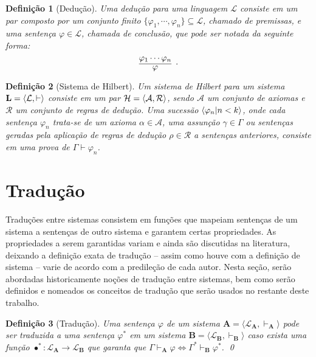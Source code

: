 \documentclass{report}
\newtheorem{definition}{Definição}
\begin{document}
    \begin{definition}[Dedução]
        Uma dedução para uma linguagem $\mathcal{L}$ consiste em um par composto por um conjunto finito $\{\varphi_1, \cdots, \varphi_n\} \subseteq \mathcal{L}$, chamado de \emph{premissas}, e uma sentença $\varphi \in \mathcal{L}$, chamada de \emph{conclusão}, que pode ser notada da seguinte forma: $$\infer[.]{\varphi}{\varphi_1 \cdots \varphi_n}$$
    \end{definition}

    \begin{definition}[Sistema de Hilbert]
        Um sistema de Hilbert para um sistema $\mathbf{L} = \langle\mathcal{L}, \vdash\rangle$ consiste em um par $\mathcal{H} = \langle\mathcal{A}, \mathcal{R}\rangle$, sendo $\mathcal{A}$ um conjunto de axiomas e $\mathcal{R}$ um conjunto de regras de dedução. Uma sucessão $\langle\varphi_n | n < k\rangle$, onde cada sentença $\varphi_n$ trata-se de um axioma $\alpha \in \mathcal{A}$, uma assunção $\gamma \in \Gamma$ ou sentenças geradas pela aplicação de regras de dedução $\rho \in \mathcal{R}$ a sentenças anteriores, consiste em uma prova de $\Gamma \vdash \varphi_n$.
    \end{definition}

    \section{Tradução}

    Traduções entre sistemas consistem em funções que mapeiam sentenças de um sistema a sentenças de outro sistema e garantem certas propriedades. As propriedades a serem garantidas variam e ainda são discutidas na literatura, deixando a definição exata de tradução -- assim como houve com a definição de sistema -- varie de acordo com a predileção de cada autor. Nesta seção, serão abordadas historicamente noções de tradução entre sistemas, bem como serão definidos e nomeados os conceitos de tradução que serão usados no restante deste trabalho.

    \begin{definition}[Tradução] 
        Uma sentença $\varphi$ de um sistema $\mathbf{A} = \langle \mathcal{L}_\mathbf{A}, \vdash_\mathbf{A}\rangle$ pode ser traduzida a uma sentença $\varphi^*$ em um sistema $\mathbf{B} = \langle \mathcal{L}_\mathbf{B}, \vdash_\mathbf{B} \rangle$ caso exista uma função $\bullet^* : \mathcal{L}_\mathbf{A} \to \mathcal{L}_\mathbf{B}$ que garanta que $\Gamma \vdash_\mathbf{A} \varphi \Leftrightarrow \Gamma^* \vdash_\mathbf{B} \varphi^*$.
        \qed
    \end{definition}
\end{document}
